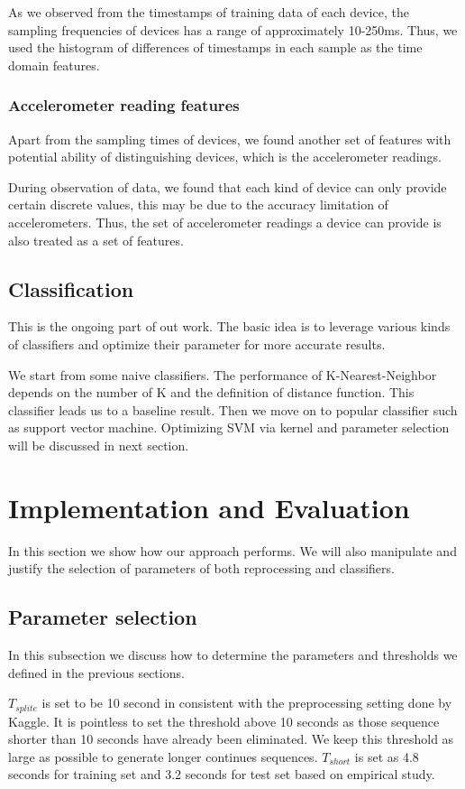 \documentclass{article} %
\begin{document}
As we observed from the timestamps of training data of each device, the sampling frequencies of devices has a range of approximately 10-250ms. Thus, we used the histogram of differences of timestamps in each sample as the time domain features.

\subsubsection{Accelerometer reading features}
Apart from the sampling times of devices, we found another set of features with potential ability of distinguishing devices, which is the accelerometer readings.

During observation of data, we found that each kind of device can only provide certain discrete values, this may be due to the accuracy limitation of accelerometers. Thus, the set of accelerometer readings a device can provide is also treated as a set of features.

\subsection{Classification}
This is the ongoing part of out work. The basic idea is to leverage various kinds of classifiers and optimize their parameter for more accurate results.

We start from some naive classifiers. The performance of K-Nearest-Neighbor depends on the number of K and the definition of distance function. This classifier leads us to a baseline result. Then we move on to popular classifier such as support vector machine. Optimizing SVM via kernel and parameter selection will be discussed in next section.

\section{Implementation and Evaluation}
In this section we show how our approach performs. We will also manipulate and justify the selection of parameters of both reprocessing and classifiers.

\subsection{Parameter selection}
In this subsection we discuss how to determine the parameters and thresholds we defined in the previous sections.

$T_{splite}$ is set to be 10 second in consistent with the preprocessing setting done by Kaggle. It is pointless to set the threshold above 10 seconds as those sequence shorter than 10 seconds have already been eliminated. We keep this threshold as large as possible to generate longer continues sequences. $T_{short}$ is set as 4.8 seconds for training set and 3.2 seconds for test set based on empirical study. 
\end{document}

